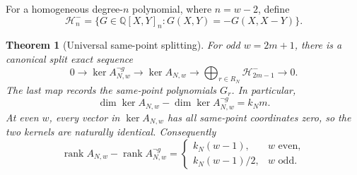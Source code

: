 \documentclass[11pt,a4paper]{article}
\newtheorem{theorem}{Theorem}[section]
\theoremstyle{definition}
\theoremstyle{remark}
\numberwithin{equation}{section}
\begin{document}
For a homogeneous degree-$n$ polynomial, where $n=w-2$, define
\[
 \mathcal H_n^-=
 \{G\in\mathbb Q[X,Y]_n:G(X,Y)=-G(X,X-Y)\}.
\]

\begin{theorem}[Universal same-point splitting]\label{fg:thm:universal}
For odd $w=2m+1$, there is a canonical split exact sequence
\[
 0\longrightarrow\ker A_{N,w}^{\neg g}
 \longrightarrow\ker A_{N,w}
 \longrightarrow\bigoplus_{r\in R_N}\mathcal H_{2m-1}^-
 \longrightarrow0.
\]
The last map records the same-point polynomials $G_r$.
In particular,
\begin{equation}\label{fg:eq:universal-nullity}
 \dim\ker A_{N,w}-\dim\ker A_{N,w}^{\neg g}=k_Nm.
\end{equation}
At even $w$, every vector in $\ker A_{N,w}$ has all same-point
coordinates zero, so the two kernels are naturally identical.
Consequently
\begin{equation}\label{fg:eq:universal-rank-difference}
 \operatorname{rank}A_{N,w}-\operatorname{rank}A_{N,w}^{\neg g}
 =\begin{cases}
    k_N(w-1),&w\text{ even},\\
    k_N(w-1)/2,&w\text{ odd}.
  \end{cases}
\end{equation}
\end{theorem}
\end{document}
